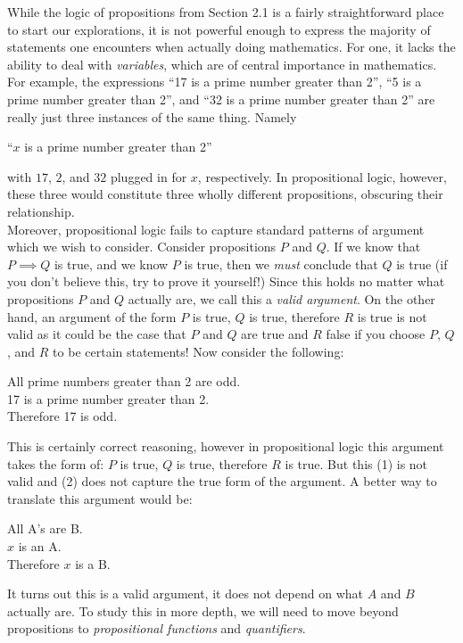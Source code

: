 While the logic of propositions from Section 2.1 is a fairly straightforward place to start our explorations, it is not powerful enough to express the majority of statements one encounters when actually doing mathematics. For one, it lacks the ability to deal with \emph{variables}, which are of central importance in mathematics. For example, the expressions ``17 is a prime number greater than 2'', ``5 is a prime number greater than 2'', and ``32 is a prime number greater than 2'' are really just three instances of the same thing. Namely 
\begin{center}
``$x$ is a prime number greater than 2'' 
\end{center}
with $17$, $2$, and $32$ plugged in for $x$, respectively. In propositional logic, however, these three would constitute three wholly different propositions, obscuring their relationship.\\

\noindent Moreover, propositional logic fails to capture standard patterns of argument which we wish to consider. Consider propositions $P$ and $Q$. If we know that $P \implies Q$ is true, and we know $P$ is true, then we \emph{must} conclude that $Q$ is true (if you don't believe this, try to prove it yourself!) Since this holds no matter what propositions $P$ and $Q$ actually are, we call this a \emph{valid argument}. On the other hand, an argument of the form $P$ is true, $Q$ is true, therefore $R$ is true is not valid as it could be the case that $P$ and $Q$ are true and $R$ false if you choose $P$, $Q$, and $R$ to be certain statements! Now consider the following: 
\begin{center}
    All prime numbers greater than 2 are odd.\\
    17 is a prime number greater than 2.\\
    Therefore 17 is odd.
\end{center}
This is certainly correct reasoning, however in propositional logic this argument takes the form of: $P$ is true, $Q$ is true, therefore $R$ is true. But this (1) is not valid and (2) does not capture the true form of the argument. A better way to translate this argument would be:
\begin{center}
    All A's are B.\\
    $x$ is an A.\\
    Therefore $x$ is a B.
\end{center}
It turns out this is a valid argument, it does not depend on what $A$ and $B$ actually are. To study this in more depth, we will need to move beyond propositions to \emph{propositional functions} and \emph{quantifiers}. 

